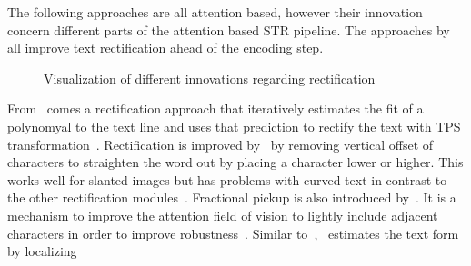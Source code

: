 The following approaches are all attention based, however their innovation concern different parts
of the attention based \ac{STR} pipeline.
The approaches by~\cite{zhan_esir_2019,luo_multi-object_2019,shi_aster_2019} all improve
text rectification ahead of the encoding step.
\begin{figure}[hb]
    \centering\scriptsize
    \caption{%
        Visualization of different innovations regarding
        rectification\label{fig:rectification-examples}
    }
\end{figure}
From~\cite{zhan_esir_2019} comes a rectification approach that iteratively estimates the fit of a
polynomyal to the text line and uses that prediction to rectify the text with \ac{TPS}
transformation~\citep{bookstein_principal_1989,zhan_esir_2019}.
Rectification is improved by~\cite{luo_multi-object_2019} by removing vertical offset of characters
to straighten the word out by placing a character lower or higher.
This works well for slanted images but has problems with curved text in contrast to the other
rectification modules~\citep{zhan_esir_2019,liu_star-net_2016,long_scene_2021}.
Fractional pickup is also introduced by~\cite{luo_multi-object_2019}.
It is a mechanism to improve the attention field of vision to lightly include adjacent characters
in order to improve robustness~\citep{luo_multi-object_2019}.
Similar to~\cite{zhan_esir_2019},~\cite{shi_aster_2019} estimates the text form by localizing
